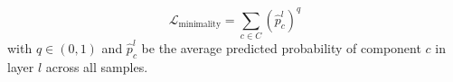 \documentclass[12pt]{article}
\title{}
\date{\today}
\author{Knud Sønderbek}
\begin{document}
\maketitle
\thispagestyle{empty}
\newpage
\tableofcontents
\thispagestyle{empty}
\newpage
{}

\[
    \mathcal{L}_{\text{minimality}} = \sum_{c \in C} (\hat{p}_{c}^l)^q 
\]
with $q \in (0,1)$ and $\hat{p}_{c}^{l}$ be the average 
predicted probability of component $c$ in layer $l$ across all samples.
\end{document}
